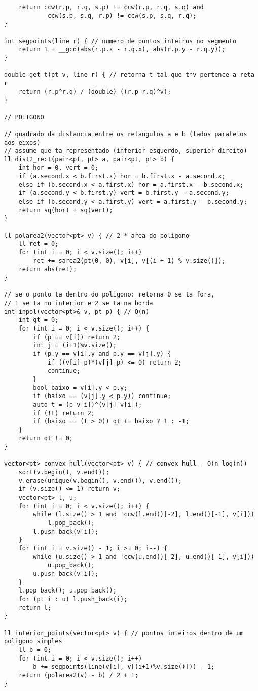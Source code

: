\documentclass[11pt, a4paper, twoside]{article}
\begin{document}
\begin{verbatim}
	return ccw(r.p, r.q, s.p) != ccw(r.p, r.q, s.q) and
			ccw(s.p, s.q, r.p) != ccw(s.p, s.q, r.q);
}

int segpoints(line r) { // numero de pontos inteiros no segmento
	return 1 + __gcd(abs(r.p.x - r.q.x), abs(r.p.y - r.q.y));
}

double get_t(pt v, line r) { // retorna t tal que t*v pertence a reta r
	return (r.p^r.q) / (double) ((r.p-r.q)^v);
}

// POLIGONO

// quadrado da distancia entre os retangulos a e b (lados paralelos aos eixos)
// assume que ta representado (inferior esquerdo, superior direito)
ll dist2_rect(pair<pt, pt> a, pair<pt, pt> b) {
	int hor = 0, vert = 0;
	if (a.second.x < b.first.x) hor = b.first.x - a.second.x;
	else if (b.second.x < a.first.x) hor = a.first.x - b.second.x;
	if (a.second.y < b.first.y) vert = b.first.y - a.second.y;
	else if (b.second.y < a.first.y) vert = a.first.y - b.second.y;
	return sq(hor) + sq(vert);
}

ll polarea2(vector<pt> v) { // 2 * area do poligono
	ll ret = 0;
	for (int i = 0; i < v.size(); i++)
		ret += sarea2(pt(0, 0), v[i], v[(i + 1) % v.size()]);
	return abs(ret);
}

// se o ponto ta dentro do poligono: retorna 0 se ta fora,
// 1 se ta no interior e 2 se ta na borda
int inpol(vector<pt>& v, pt p) { // O(n)
	int qt = 0;
	for (int i = 0; i < v.size(); i++) {
		if (p == v[i]) return 2;
		int j = (i+1)%v.size();
		if (p.y == v[i].y and p.y == v[j].y) {
			if ((v[i]-p)*(v[j]-p) <= 0) return 2;
			continue;
		}
		bool baixo = v[i].y < p.y;
		if (baixo == (v[j].y < p.y)) continue;
		auto t = (p-v[i])^(v[j]-v[i]);
		if (!t) return 2;
		if (baixo == (t > 0)) qt += baixo ? 1 : -1;
	}
	return qt != 0;
}

vector<pt> convex_hull(vector<pt> v) { // convex hull - O(n log(n))
	sort(v.begin(), v.end());
	v.erase(unique(v.begin(), v.end()), v.end());
	if (v.size() <= 1) return v;
	vector<pt> l, u;
	for (int i = 0; i < v.size(); i++) {
		while (l.size() > 1 and !ccw(l.end()[-2], l.end()[-1], v[i]))
			l.pop_back();
		l.push_back(v[i]);
	}
	for (int i = v.size() - 1; i >= 0; i--) {
		while (u.size() > 1 and !ccw(u.end()[-2], u.end()[-1], v[i]))
			u.pop_back();
		u.push_back(v[i]);
	}
	l.pop_back(); u.pop_back();
	for (pt i : u) l.push_back(i);
	return l;
}

ll interior_points(vector<pt> v) { // pontos inteiros dentro de um poligono simples
	ll b = 0;
	for (int i = 0; i < v.size(); i++)
		b += segpoints(line(v[i], v[(i+1)%v.size()])) - 1;
	return (polarea2(v) - b) / 2 + 1;
}


\end{verbatim}
\end{document}
